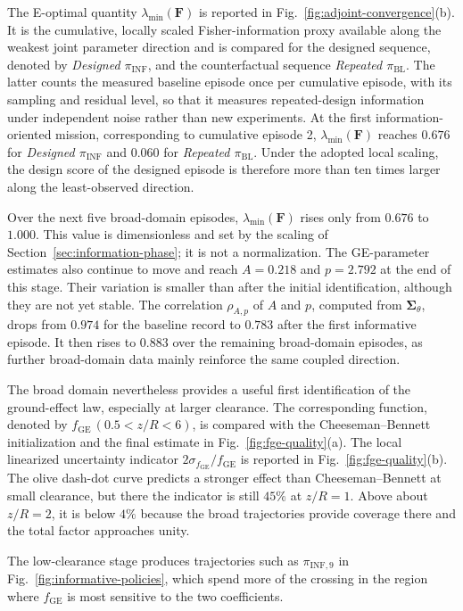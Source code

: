 \documentclass[journal]{IEEEtran}
\begin{document}
The E-optimal quantity $\lambda_{\min}(\mathbf F)$ is reported in Fig.~\ref{fig:adjoint-convergence}(b). It is the cumulative, locally scaled Fisher-information proxy available along the weakest joint parameter direction and is compared for the designed sequence, denoted by \emph{Designed $\pi_{\mathrm{INF}}$}, and the counterfactual sequence \emph{Repeated $\pi_{\mathrm{BL}}$}. The latter counts the measured baseline episode once per cumulative episode, with its sampling and residual level, so that it measures repeated-design information under independent noise rather than new experiments. At the first information-oriented mission, corresponding to cumulative episode 2, $\lambda_{\min}(\mathbf F)$ reaches $0.676$ for \emph{Designed $\pi_{\mathrm{INF}}$} and $0.060$ for \emph{Repeated $\pi_{\mathrm{BL}}$}. Under the adopted local scaling, the design score of the designed episode is therefore more than ten times larger along the least-observed direction.

Over the next five broad-domain episodes, $\lambda_{\min}(\mathbf F)$ rises only from $0.676$ to $1.000$. This value is dimensionless and set by the scaling of Section~\ref{sec:information-phase}; it is not a normalization. The GE-parameter estimates also continue to move and reach $A=0.218$ and $p=2.792$ at the end of this stage. Their variation is smaller than after the initial identification, although they are not yet stable. The correlation $\rho_{A,p}$ of $A$ and $p$, computed from $\boldsymbol{\Sigma}_{\theta}$, drops from $0.974$ for the baseline record to $0.783$ after the first informative episode. It then rises to $0.883$ over the remaining broad-domain episodes, as further broad-domain data mainly reinforce the same coupled direction.

The broad domain nevertheless provides a useful first identification of the ground-effect law, especially at larger clearance. The corresponding function, denoted by $f_{\mathrm{GE}}\,(0.5<z/R<6)$, is compared with the Cheeseman--Bennett initialization and the final estimate in Fig.~\ref{fig:fge-quality}(a). The local linearized uncertainty indicator $2\sigma_{f_{\mathrm{GE}}}/f_{\mathrm{GE}}$ is reported in Fig.~\ref{fig:fge-quality}(b). The olive dash-dot curve predicts a stronger effect than Cheeseman--Bennett at small clearance, but there the indicator is still $45\%$ at $z/R=1$. Above about $z/R=2$, it is below $4\%$ because the broad trajectories provide coverage there and the total factor approaches unity.

The low-clearance stage produces trajectories such as $\pi_{\mathrm{INF},9}$ in Fig.~\ref{fig:informative-policies}, which spend more of the crossing in the region where $f_{\mathrm{GE}}$ is most sensitive to the two coefficients.
\end{document}
